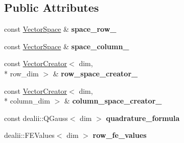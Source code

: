 \subsection*{Public Attributes}
\begin{DoxyCompactItemize}
\item 
\hypertarget{structSpacy_1_1dealII_1_1Detail_1_1LocalAssemblyBase_a56425b34eab9e4ff115a0510b4ef8d80}{const \hyperlink{classSpacy_1_1VectorSpace}{Vector\-Space} \& {\bfseries space\-\_\-row\-\_\-}}\label{structSpacy_1_1dealII_1_1Detail_1_1LocalAssemblyBase_a56425b34eab9e4ff115a0510b4ef8d80}

\item 
\hypertarget{structSpacy_1_1dealII_1_1Detail_1_1LocalAssemblyBase_ac7e2cb1ae6e82e7b742ba445424f95f4}{const \hyperlink{classSpacy_1_1VectorSpace}{Vector\-Space} \& {\bfseries space\-\_\-column\-\_\-}}\label{structSpacy_1_1dealII_1_1Detail_1_1LocalAssemblyBase_ac7e2cb1ae6e82e7b742ba445424f95f4}

\item 
\hypertarget{structSpacy_1_1dealII_1_1Detail_1_1LocalAssemblyBase_a7e6212a0a69a567a098b37be7e84c773}{const \hyperlink{classSpacy_1_1dealII_1_1VectorCreator}{Vector\-Creator}$<$ dim, \\*
row\-\_\-dim $>$ \& {\bfseries row\-\_\-space\-\_\-creator\-\_\-}}\label{structSpacy_1_1dealII_1_1Detail_1_1LocalAssemblyBase_a7e6212a0a69a567a098b37be7e84c773}

\item 
\hypertarget{structSpacy_1_1dealII_1_1Detail_1_1LocalAssemblyBase_a526dfed72a82cc827edc8ca4cd066ac2}{const \hyperlink{classSpacy_1_1dealII_1_1VectorCreator}{Vector\-Creator}$<$ dim, \\*
column\-\_\-dim $>$ \& {\bfseries column\-\_\-space\-\_\-creator\-\_\-}}\label{structSpacy_1_1dealII_1_1Detail_1_1LocalAssemblyBase_a526dfed72a82cc827edc8ca4cd066ac2}

\item 
\hypertarget{structSpacy_1_1dealII_1_1Detail_1_1LocalAssemblyBase_a64d2a187dd531b701364de8e27a757c5}{const dealii\-::\-Q\-Gauss$<$ dim $>$ {\bfseries quadrature\-\_\-formula}}\label{structSpacy_1_1dealII_1_1Detail_1_1LocalAssemblyBase_a64d2a187dd531b701364de8e27a757c5}

\item 
\hypertarget{structSpacy_1_1dealII_1_1Detail_1_1LocalAssemblyBase_a21eb2f046a9126dc88da9f24f3d32c7e}{dealii\-::\-F\-E\-Values$<$ dim $>$ {\bfseries row\-\_\-fe\-\_\-values}}\label{structSpacy_1_1dealII_1_1Detail_1_1LocalAssemblyBase_a21eb2f046a9126dc88da9f24f3d32c7e}


\end{DoxyCompactItemize}
